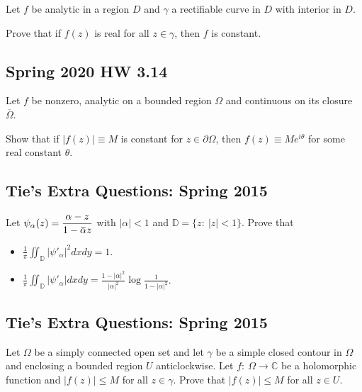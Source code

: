 Let \(f\) be analytic in a region \(D\) and \(\gamma\) a rectifiable
curve in \(D\) with interior in \(D\).

Prove that if \(f(z)\) is real for all \(z\in \gamma\), then \(f\) is
constant.

\hypertarget{spring-2020-hw-3.14}{%
\subsection{Spring 2020 HW 3.14}\label{spring-2020-hw-3.14}}

Let \(f\) be nonzero, analytic on a bounded region \(\Omega\) and
continuous on its closure \(\overline \Omega\).

Show that if \({\left\lvert {f(z)} \right\rvert} \equiv M\) is constant
for \(z\in \partial \Omega\), then \(f(z) \equiv Me^{i\theta}\) for some
real constant \(\theta\).

\hypertarget{ties-extra-questions-spring-2015-4}{%
\subsection{Tie's Extra Questions: Spring
2015}\label{ties-extra-questions-spring-2015-4}}

Let
\(\displaystyle{\psi_{\alpha}(z)=\frac{\alpha-z}{1-\mkern 1.5mu\overline{\mkern-1.5mu\alpha\mkern-1.5mu}\mkern 1.5muz}}\)
with \(|\alpha|<1\) and \({\mathbb D}=\{z:\ |z|<1\}\). Prove that

\begin{itemize}
\item
  \(\displaystyle{\frac{1}{\pi}\iint_{{\mathbb D}} |\psi'_{\alpha}|^2 dx dy =1}\).
\item
  \(\displaystyle{\frac{1}{\pi}\iint_{{\mathbb D}} |\psi'_{\alpha}| dx dy =\frac{1-|\alpha|^2}{|\alpha|^2} \log \frac{1}{1-|\alpha|^2}}\).
\end{itemize}

\hypertarget{ties-extra-questions-spring-2015-5}{%
\subsection{Tie's Extra Questions: Spring
2015}\label{ties-extra-questions-spring-2015-5}}

Let \(\Omega\) be a simply connected open set and let \(\gamma\) be a
simple closed contour in \(\Omega\) and enclosing a bounded region \(U\)
anticlockwise. Let \(f: \ \Omega \to {\mathbb C}\) be a holomorphic
function and \(|f(z)|\leq M\) for all \(z\in \gamma\). Prove that
\(|f(z)|\leq M\) for all \(z\in U\).

